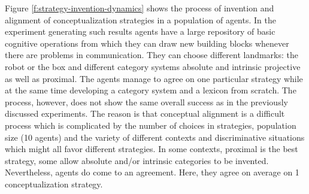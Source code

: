 Figure \ref{f:strategy-invention-dynamics} shows the process of invention and alignment of 
conceptualization strategies in a population of agents. In the experiment generating such results agents 
have a large repository of basic cognitive operations from which they can draw new building blocks 
whenever there are problems in communication. They can choose different landmarks: the robot or
the box and different category systems absolute and intrinsic projective as well as proximal.
The agents manage to agree on one particular strategy while at the same time developing a 
category system and a lexicon from scratch. The process, however, does not show the
same overall success as in the previously discussed experiments. The reason is that 
conceptual alignment is a difficult process which is complicated by the number 
of choices in strategies, population size (10 agents) and the variety 
of different contexts and discriminative situations which might all favor different strategies. 
In some contexts, proximal is the best strategy, some allow absolute and/or intrinsic categories 
to be invented. Nevertheless, agents do come to an agreement. Here, they agree on average on 
1 conceptualization strategy.

